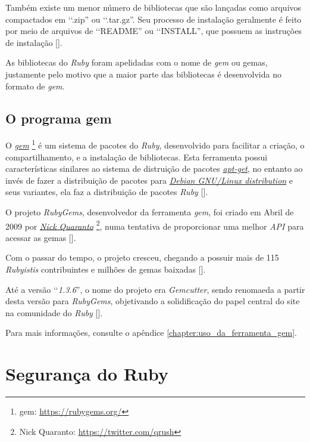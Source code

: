 Também existe um menor número de bibliotecas que são lançadas como arquivos compactados em ‘‘.zip''
ou ‘‘.tar.gz''. Seu processo de instalação geralmente é feito por meio de arquivos de ‘‘README''
ou ‘‘INSTALL'', que possuem as instruções de instalação [].

As bibliotecas do \emph{Ruby} foram apelidadas com o nome de \emph{gem} ou gemas, justamente pelo
motivo que a maior parte das bibliotecas é desenvolvida no formato de \emph{gem}.

\subsection{O programa gem}
\label{subsection:o_programa_gem}

O \emph{\href{https://rubygems.org/}{gem}} \footnote{gem: \url{https://rubygems.org/}} é um sistema
de pacotes do \emph{Ruby}, desenvolvido para facilitar a criação, o compartilhamento, e a instalação de
bibliotecas. Esta ferramenta possui características sinilares ao sistema de distruição de pacotes
\emph{\href{https://packages.qa.debian.org/a/apt.html}{apt-get}}, no entanto ao invés de fazer a distribuição
de pacotes para \emph{\href{https://www.debian.org/}{Debian GNU/Linux distribution}} e seus variantes, ela faz
a distribuição de pacotes \emph{Ruby} [].

O projeto \emph{RubyGems}, desenvolvedor da ferramenta \emph{gem}, foi criado em Abril de 2009 por
\emph{\href{https://twitter.com/qrush}{Nick Quaranto}} \footnote{Nick Quaranto: \url{https://twitter.com/qrush}},
numa tentativa de proporcionar uma melhor \emph{API} para acessar as gemas [].

Com o passar do tempo, o projeto cresceu, chegando a possuir mais de 115 \emph{Rubyistis} contribuintes e
milhões de gemas baixadas [].

Até a versão ‘‘\emph{1.3.6}'', o nome do projeto era \emph{Gemcutter}, sendo renomaeda a partir desta versão
para \emph{RubyGems}, objetivando a solidificação do papel central do site na comunidade do \emph{Ruby}
[].

Para mais informações, consulte o apêndice \ref{chapter:uso_da_ferramenta_gem}.

\section{Segurança do Ruby}
\label{section:segurança_do_ruby}

